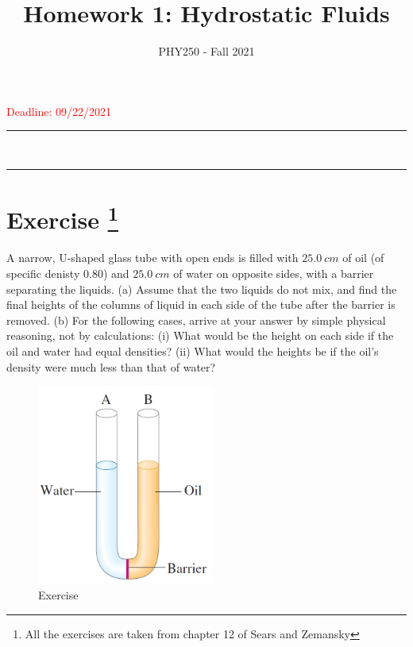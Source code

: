 \documentclass[12pt]{article}
\title{Homework 1: Hydrostatic Fluids}
\author{PHY250 - Fall 2021}
\date{}
\newcommand{\HRule}{\rule{\linewidth}{0.5mm}}
\begin{document}
\maketitle

 \textcolor{red}{ Deadline:  09/22/2021}

\vspace{5mm}

\begin{spacing}{0.3}
    \noindent
    \HRule\\
    \HRule
\end{spacing}
\vspace{5mm}




\setcounter{example}{1}

\section*{Exercise \theexample \footnote{All the exercises are taken from chapter 12 of Sears and Zemansky}}

A narrow, U-shaped glass
tube with open ends is filled with
$25.0~cm$ of oil (of specific denisty
$0.80$) and $25.0 ~cm$ of water on opposite
sides, with a barrier separating
the liquids. (a) Assume
that the two liquids do not mix, and
find the final heights of the columns
of liquid in each side of the tube
after the barrier is removed. (b) For
the following cases, arrive at your
answer by simple physical reasoning,
not by calculations: (i) What would be the height on each side if the
oil and water had equal densities? (ii) What would the heights be if
the oil’s density were much less than that of water?


\begin{figure}[h!]
  \begin{center}
    \includegraphics[height=2.6in]{images/figure4.jpg}
    \caption{Exercise \theexample }
    \label{4}
  \end{center}
\end{figure}
\end{document}
